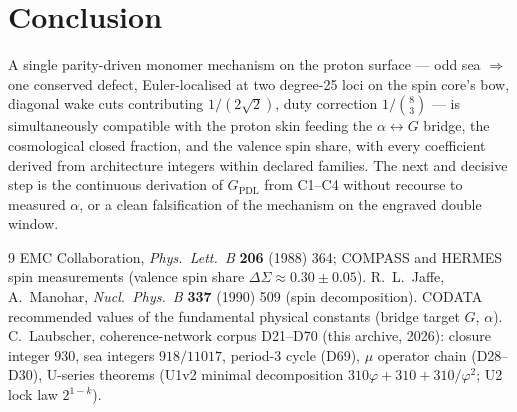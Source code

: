 \documentclass[11pt,a4paper]{article}
\begin{document}
\section{Conclusion}
A single parity-driven monomer mechanism on the proton surface --- odd sea $\Rightarrow$ one conserved defect, Euler-localised at two degree-25 loci on the spin core's bow, diagonal wake cuts contributing $1/(2\sqrt{2})$, duty correction $1/\binom{8}{3}$ --- is simultaneously compatible with the proton skin feeding the $\alpha\leftrightarrow G$ bridge, the cosmological closed fraction, and the valence spin share, with every coefficient derived from architecture integers within declared families. The next and decisive step is the continuous derivation of $G_{\mathrm{PDL}}$ from C1--C4 without recourse to measured $\alpha$, or a clean falsification of the mechanism on the engraved double window.

\begin{thebibliography}{9}
 EMC Collaboration, \emph{Phys.\ Lett.\ B} \textbf{206} (1988) 364; COMPASS and HERMES spin measurements (valence spin share $\Delta\Sigma \approx 0.30 \pm 0.05$).
 R.~L.\ Jaffe, A.~Manohar, \emph{Nucl.\ Phys.\ B} \textbf{337} (1990) 509 (spin decomposition).
 CODATA recommended values of the fundamental physical constants (bridge target $G$, $\alpha$).
 C.~Laubscher, coherence-network corpus D21--D70 (this archive, 2026): closure integer $930$, sea integers $918/11017$, period-3 cycle (D69), $\mu$ operator chain (D28--D30), U-series theorems (U1v2 minimal decomposition $310\varphi + 310 + 310/\varphi^{2}$; U2 lock law $2^{1-k}$).
\end{thebibliography}
\end{document}
